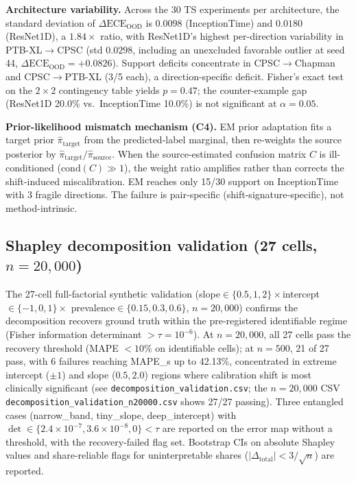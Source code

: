 \documentclass[review,12pt,nonatbib]{elsarticle}
\begin{document}
\textbf{Architecture variability.} Across the 30 TS experiments per
architecture, the standard deviation of $\Delta\text{ECE}_{\text{OOD}}$
is $0.0098$ (InceptionTime) and $0.0180$ (ResNet1D), a $1.84\times$
ratio, with ResNet1D's highest per-direction variability in
PTB-XL$\rightarrow$CPSC (std $0.0298$, including an unexcluded
favorable outlier at seed 44, $\Delta\text{ECE}_{\text{OOD}}=+0.0826$).
Support deficits concentrate in CPSC$\rightarrow$Chapman and
CPSC$\rightarrow$PTB-XL (3/5 each), a direction-specific deficit.
Fisher's exact test on the $2\times2$ contingency table yields
$p = 0.47$; the counter-example gap (ResNet1D 20.0\% vs.\
InceptionTime 10.0\%) is not significant at $\alpha = 0.05$.

\textbf{Prior-likelihood mismatch mechanism (C4).} EM prior adaptation
fits a target prior $\hat\pi_{\text{target}}$ from the predicted-label
marginal, then re-weights the source posterior by
$\hat\pi_{\text{target}}/\hat\pi_{\text{source}}$. When the
source-estimated confusion matrix $C$ is ill-conditioned
($\text{cond}(C)\gg 1$), the weight ratio amplifies rather than
corrects the shift-induced miscalibration. EM reaches only 15/30
support on InceptionTime with 3 fragile directions. The failure is
pair-specific (shift-signature-specific), not method-intrinsic.

\subsection{Shapley decomposition validation (27 cells, $n=20{,}000$)}
\label{sec:shapley}
The 27-cell full-factorial synthetic validation
(slope$\in\{0.5,1,2\}\times$intercept$\in\{-1,0,1\}\times$
prevalence$\in\{0.15,0.3,0.6\}$, $n=20{,}000$) confirms the
decomposition recovers ground truth within the pre-registered
identifiable regime (Fisher information determinant $>\tau=10^{-6}$).
At $n=20{,}000$, all 27 cells pass the recovery threshold (MAPE
$<10\%$ on identifiable cells); at $n=500$, 21 of 27 pass, with 6
failures reaching MAPE\_s up to 42.13\%, concentrated in extreme
intercept ($\pm 1$) and slope ($0.5, 2.0$) regions where calibration
shift is most clinically significant (see
\texttt{decomposition\_validation.csv}; the $n=20{,}000$ CSV
\texttt{decomposition\_validation\_}\allowbreak\texttt{n20000.csv}
shows 27/27 passing). Three entangled cases (narrow\_band,
tiny\_slope, deep\_intercept) with
$\det\in\{2.4\times10^{-7}, 3.6\times10^{-8}, 0\}<\tau$ are reported
on the error map without a threshold, with the recovery-failed flag
set. Bootstrap CIs on absolute Shapley values and share-reliable
flags for uninterpretable shares ($|\Delta_{\text{total}}|<3/\sqrt{n}$)
are reported.
\end{document}
